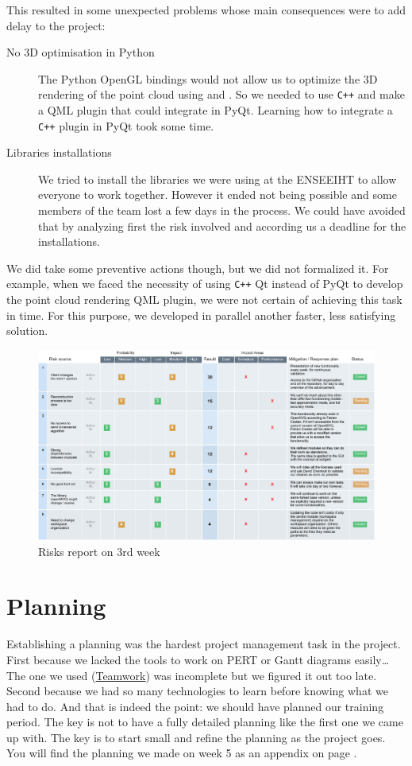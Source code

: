 This resulted in some unexpected problems whose main consequences were
to add delay to the project:

\begin{description}
\item[No 3D optimisation in Python] The Python OpenGL bindings would
  not allow us to optimize the 3D rendering of the point cloud using
   and . So we needed
  to use \verb!C++! and make a QML plugin that could integrate in
  PyQt. Learning how to integrate a \verb!C++! plugin in PyQt took some time.
\item[Libraries installations] We tried to install the libraries we
  were using at the ENSEEIHT to allow everyone to work
  together. However it ended not being possible and some members of
  the team lost a few days in the process. We could have avoided that
  by analyzing first the risk involved and according us a deadline for
  the installations.
\end{description}

We did take some preventive actions though, but we did not formalized
it. For example, when we faced the necessity of using \verb!C++! Qt instead
of PyQt to develop the point cloud rendering QML plugin, we were not
certain of achieving this task in time. For this purpose, we developed
in parallel another faster, less satisfying solution.


\begin{figure}[!htbp]
  \centering
  \includegraphics[width=\linewidth]{img/risks.pdf}
  \caption{Risks report on 3rd week}
  \label{fig:risks}
\end{figure}

\section{Planning}

Establishing a planning was the hardest project management task in the
project. First because we lacked the tools to work on PERT or Gantt
diagrams easily\ldots The one we used
(\href{https://www.teamwork.com/}{Teamwork}) was incomplete but we
figured it out too late. Second because we had so many technologies to
learn before knowing what we had to do. And that is indeed the point:
we should have planned our training period. The key is not to have a
fully detailed planning like the first one we came up with. The key is
to start small and refine the planning as the project goes. You will
find the planning we made on week 5 as an appendix on page
\pageref{app:planning}.
